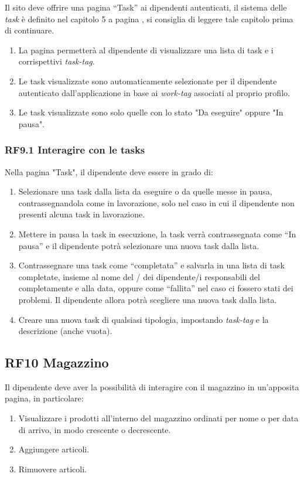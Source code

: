 \documentclass{report}
\begin{document}
Il sito deve offrire una pagina “Task” ai dipendenti autenticati, il sistema delle \textit{task} è definito nel capitolo 5 a pagina \pageref{chap:tasks}, si consiglia di leggere tale capitolo prima di continuare.

\begin{enumerate}
	\item La pagina permetterà al dipendente di visualizzare una lista di task e i corrispettivi \textit{task-tag}.
	
	\item Le task visualizzate sono automaticamente selezionate per il dipendente autenticato dall’applicazione in base ai \textit{work-tag} associati al proprio profilo.
	
	\item Le task visualizzate sono solo quelle con lo stato "Da eseguire" oppure "In pausa".

	
\end{enumerate}

\subsubsection*{RF9.1 Interagire con le tasks}

Nella pagina "Task", il dipendente deve essere in grado di:

\begin{enumerate}
	\item Selezionare una task dalla lista da eseguire o da quelle messe in pausa, contrassegnandola come in lavorazione, solo nel caso in cui il dipendente non presenti alcuna task in lavorazione.
	
	\item Mettere in pausa la task in esecuzione, la task verrà contrassegnata come “In pausa” e il dipendente potrà selezionare una nuova task dalla lista.
	
	\item Contrassegnare una task come “completata” e salvarla in una lista di task completate, insieme al nome del / dei dipendente/i responsabili del completamente e alla data, oppure come “fallita” nel caso ci fossero stati dei problemi. Il dipendente allora potrà scegliere una nuova task dalla lista.
	
	\item Creare una nuova task di qualsiasi tipologia, impostando \textit{task-tag} e la descrizione (anche vuota).
\end{enumerate}

\subsection*{RF10 Magazzino}
Il dipendente deve aver la possibilità di interagire con il magazzino in un'apposita pagina, in particolare:
\begin{enumerate}
	\item Visualizzare i prodotti all'interno del magazzino ordinati per nome o per data di arrivo, in modo crescente o decrescente.
	\item Aggiungere articoli.
	\item Rimuovere articoli.
\end{enumerate}
\end{document}
